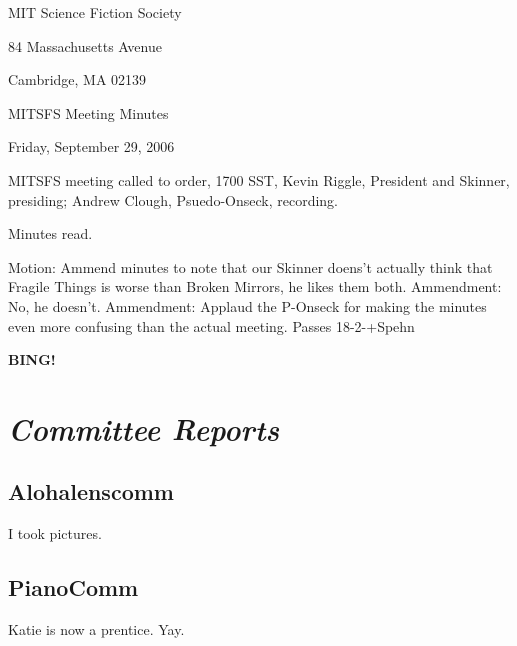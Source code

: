 \documentclass[10pt]{article}
\newcommand{\bing}{{\bf BING!} }
\newcommand{\goto}[1]{\bing \vskip 12pt \section*{{\em{#1}}}}
\begin{document}
\begin{center}

MIT Science Fiction Society

84 Massachusetts Avenue

Cambridge, MA 02139

\vspace{12pt}

MITSFS Meeting Minutes

Friday, September 29, 2006

\end{center}

\vspace{18pt}

\setlength{\parskip}{6pt}

\noindent
MITSFS meeting called to order, 1700 SST,
Kevin Riggle, President and Skinner, presiding; Andrew Clough, Psuedo-Onseck, recording.

Minutes read.

Motion:  Ammend minutes to note that our Skinner doens't actually think that Fragile Things is worse than Broken Mirrors, he likes them both.
Ammendment:  No, he doesn't.
Ammendment:  Applaud the P-Onseck for making the minutes even more confusing than the actual meeting.  Passes 18-2-+Spehn

\goto{Committee Reports}

\subsection*{Alohalenscomm}

I took pictures.

\subsection*{PianoComm}

Katie is now a prentice. Yay.



\end{document}
